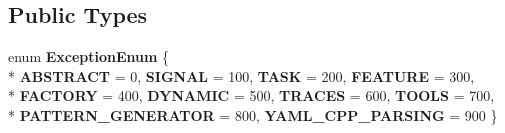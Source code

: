 \subsection*{Public Types}
\begin{DoxyCompactItemize}
\item 
enum {\bfseries Exception\+Enum} \{ \\*
{\bfseries A\+B\+S\+T\+R\+A\+CT} = 0, 
{\bfseries S\+I\+G\+N\+AL} = 100, 
{\bfseries T\+A\+SK} = 200, 
{\bfseries F\+E\+A\+T\+U\+RE} = 300, 
\\*
{\bfseries F\+A\+C\+T\+O\+RY} = 400, 
{\bfseries D\+Y\+N\+A\+M\+IC} = 500, 
{\bfseries T\+R\+A\+C\+ES} = 600, 
{\bfseries T\+O\+O\+LS} = 700, 
\\*
{\bfseries P\+A\+T\+T\+E\+R\+N\+\_\+\+G\+E\+N\+E\+R\+A\+T\+OR} = 800, 
{\bfseries Y\+A\+M\+L\+\_\+\+C\+P\+P\+\_\+\+P\+A\+R\+S\+I\+NG} = 900
 \}\hypertarget{classdynamic__graph_1_1ExceptionAbstract_a6c51d9c9d422045a68340908bb766ee9}{}\label{classdynamic__graph_1_1ExceptionAbstract_a6c51d9c9d422045a68340908bb766ee9}

\end{DoxyCompactItemize}
